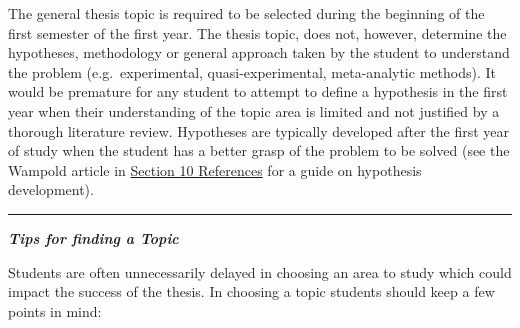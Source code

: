 \documentclass[openany]{book}
\begin{document}
The general thesis topic is required to be selected during the beginning of the first semester of the first year. The thesis topic, does not, however, determine the hypotheses, methodology or general approach taken by the student to understand the problem (e.g.~experimental, quasi-experimental, meta-analytic methods). It would be premature for any student to attempt to define a hypothesis in the first year when their understanding of the topic area is limited and not justified by a thorough literature review. Hypotheses are typically developed after the first year of study when the student has a better grasp of the problem to be solved (see the Wampold article in \protect\hyperlink{resources}{Section 10 References} for a guide on hypothesis development).

\begin{center}\rule{0.5\linewidth}{0.5pt}\end{center}

\textbf{\emph{Tips for finding a Topic}}

Students are often unnecessarily delayed in choosing an area to study which could impact the success of the thesis. In choosing a topic students should keep a few points in mind:
\end{document}
